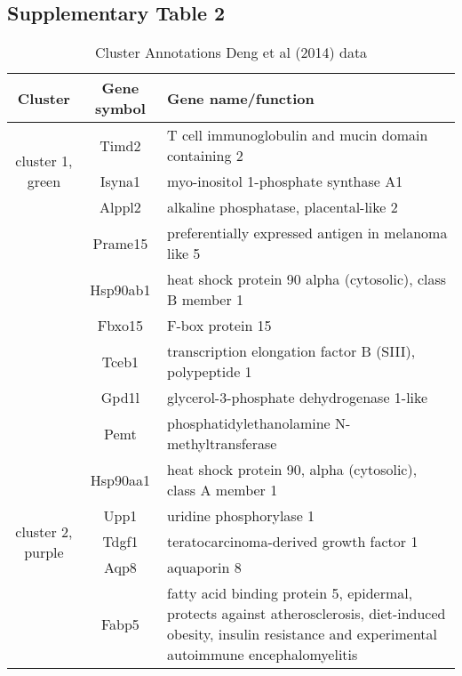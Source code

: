 \subsection{Supplementary Table 2}
\begin{table}[htp]
\begin{center}
\caption{Cluster Annotations Deng et al (2014) data} \label{tab:tab3}
\begin{tabular}{|c|c|p{3.6in}|} 
\hline
Cluster & Gene symbol &  Gene name/function  \\
\hline
 \multirow{3}{4em}{\small{cluster 1, green}}  &  \footnotesize{Timd2} & \footnotesize{ T cell immunoglobulin and mucin domain containing 2} \\ 
 					      & \footnotesize{Isyna1} &  \footnotesize{myo-inositol 1-phosphate synthase A1} \\
					      & \footnotesize{Alppl2} & \footnotesize{alkaline phosphatase, placental-like 2} \\
					      & \footnotesize{Prame15} & \footnotesize{preferentially expressed antigen in melanoma like 5} \\
					      & \footnotesize{Hsp90ab1} & \footnotesize{heat shock protein 90 alpha (cytosolic), class B member 1} \\
					      & \footnotesize{Fbxo15} & \footnotesize{F-box protein 15} \\
					      & \footnotesize{Tceb1} & \footnotesize{transcription elongation factor B (SIII), polypeptide 1} \\
					      & \footnotesize{Gpd1l } & \footnotesize{glycerol-3-phosphate dehydrogenase 1-like}  \\
					      & \footnotesize{Pemt} &\footnotesize{phosphatidylethanolamine N-methyltransferase} \\
					      & \footnotesize{Hsp90aa1} & \footnotesize{heat shock protein 90, alpha (cytosolic), class A member 1} \\ 
\hline
 \multirow{3}{4em}{\small{cluster 2,  purple}} & \footnotesize{Upp1} & \footnotesize{uridine phosphorylase 1} \\ 					    & \footnotesize{Tdgf1} & \footnotesize{teratocarcinoma-derived growth factor 1} \\
			    &  \footnotesize{Aqp8} &  \footnotesize{aquaporin 8} \\
			    &  \footnotesize{Fabp5} & \footnotesize{fatty acid binding protein 5, epidermal, protects against atherosclerosis, diet-induced obesity, insulin resistance and experimental autoimmune encephalomyelitis}  \\

\end{tabular}
\end{center}
\end{table}
